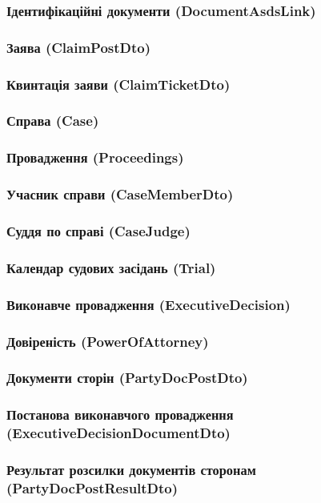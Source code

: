 \documentclass{article}
\begin{document}
\subsubsection{Ідентифікаційні документи (DocumentAsdsLink)}
\subsubsection{Заява (ClaimPostDto)}
\subsubsection{Квинтація заяви (ClaimTicketDto)}
\subsubsection{Справа (Case)}
\subsubsection{Провадження (Proceedings)}
\subsubsection{Учасник справи (CaseMemberDto)}
\subsubsection{Суддя по справі (CaseJudge)}
\subsubsection{Календар судових засідань (Trial)}
\subsubsection{Виконавче провадження (ExecutiveDecision)}
\subsubsection{Довіреність (PowerOfAttorney)}
\subsubsection{Документи сторін (PartyDocPostDto)}
\subsubsection{Постанова виконавчого провадження (ExecutiveDecisionDocumentDto)}
\subsubsection{Результат розсилки документів сторонам (PartyDocPostResultDto)}
\end{document}
